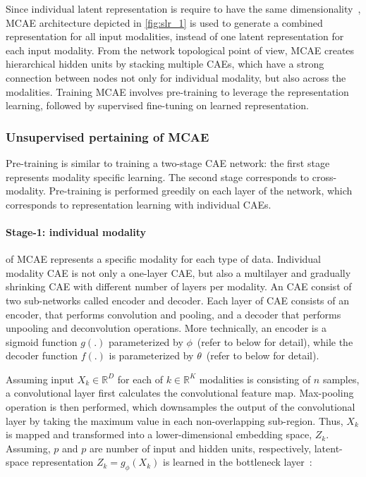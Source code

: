 \hspace*{3.5mm} Since individual latent representation is require to have the same dimensionality~\cite{mmdcae}, MCAE architecture depicted in \cref{fig:slr_1} is used to generate a combined representation for all input modalities, instead of one latent representation for each input modality. From the network topological point of view, MCAE creates hierarchical hidden units by stacking multiple CAEs, which have a strong connection between nodes not only for individual modality, but also across the modalities. Training MCAE involves pre-training to leverage the representation learning, followed by supervised fine-tuning on learned representation. 

\subsubsection{Unsupervised pertaining of MCAE} 
Pre-training is similar to training a two-stage CAE network: the first stage represents modality specific learning. The second stage corresponds to cross-modality. Pre-training is performed greedily on each layer of the network, which corresponds to representation learning with individual CAEs. 

\paragraph{Stage-1: individual modality}\hspace{-3mm} of MCAE represents a specific modality for each type of data. Individual modality CAE is not only a one-layer CAE, but also a multilayer and gradually shrinking CAE with different number of layers per modality. An CAE consist of two sub-networks called encoder and decoder. Each layer of CAE consists of an encoder, that performs convolution and pooling, and a decoder that performs unpooling and deconvolution operations. More technically, an encoder is a sigmoid function $g(.)$ parameterized by $\phi$~(refer to below for detail), while the decoder function $f(.)$ is parameterized by $\theta$~(refer to below for detail). 

\hspace*{3.5mm} Assuming input $X_{k} \in \mathbb{R}^{D}$ for each of $k \in \mathbb{R}^K$ modalities is consisting of $n$ samples, a convolutional layer first calculates the convolutional feature map. Max-pooling operation is then performed, which downsamples the output of the convolutional layer by taking the maximum value in each non-overlapping sub-region. Thus, $X_{k}$ is mapped and transformed into a lower-dimensional embedding space, $Z_k$. Assuming, $p$ and $p$ are number of input and hidden units, respectively, latent-space representation $Z_k=g_{\phi}(X_{k})$ is learned in the bottleneck layer~\cite{mmdcae}: 

